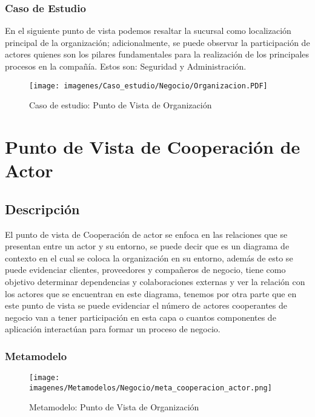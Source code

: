 \subsubsection{Caso de Estudio}
En el siguiente punto de vista podemos resaltar la sucursal como localización principal de la organización; adicionalmente, se puede observar la participación de actores quienes son los pilares fundamentales para la realización de los principales procesos en la compañía. Estos son: Seguridad y Administración.

\begin{figure}[h]
	\centering
	\texttt{[image: imagenes/Caso\_estudio/Negocio/Organizacion.PDF]}
	\caption{Caso de estudio: Punto de Vista de Organización}
	\label{fig:gap_analysis}
\end{figure}




\section{Punto de Vista de Cooperación de Actor}
\subsection{Descripción}
El punto de vista de Cooperación de actor se enfoca en las relaciones que se presentan entre un actor y su entorno, se puede decir que es un diagrama de contexto en el cual se coloca la organización en su entorno, además de esto se puede evidenciar clientes, proveedores y compañeros de negocio, tiene como objetivo determinar dependencias y colaboraciones externas y ver la relación con los actores que se encuentran en este diagrama, tenemos por otra parte que en este punto de vista se puede evidenciar el número de actores cooperantes  de negocio van a tener participación en esta capa o cuantos componentes de aplicación interactúan para formar un proceso de negocio.

\subsubsection{Metamodelo}
\begin{figure}[h]
	\centering
	\texttt{[image: imagenes/Metamodelos/Negocio/meta\_cooperacion\_actor.png]}
	\caption{Metamodelo: Punto de Vista de Organización}
	\label{fig:gap_analysis}
\end{figure}





